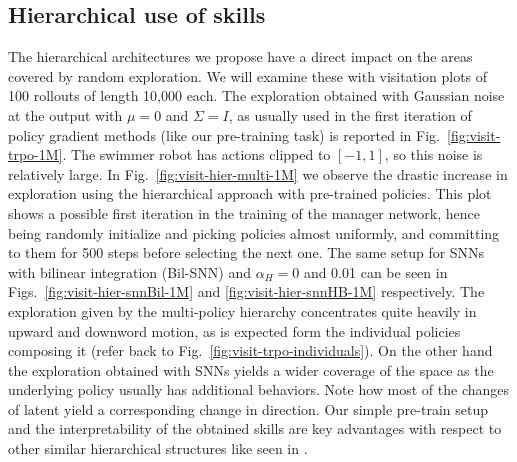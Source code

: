 \documentclass{article} %
\begin{document}

\subsection{Hierarchical use of skills}

The hierarchical architectures we propose have a direct impact on the areas covered by random exploration. We will examine these with visitation plots of 100 rollouts of length 10,000 each. The exploration obtained with Gaussian noise at the output with $\mu=0$ and $\Sigma=I$, as usually used in the first iteration of policy gradient methods (like our pre-training task) is reported in Fig.\ \ref{fig:visit-trpo-1M}. The swimmer robot has actions clipped to $[-1,1]$, so this noise is relatively large. In Fig.\ \ref{fig:visit-hier-multi-1M} we observe the drastic increase in exploration using the hierarchical approach with pre-trained policies. This plot shows a possible first iteration in the training of the manager network, hence being randomly initialize and picking policies almost uniformly, and committing to them for 500 steps before selecting the next one. The same setup for SNNs with bilinear integration (Bil-SNN) and $\alpha_H= 0$ and 0.01 can be seen in Figs.\ \ref{fig:visit-hier-snnBil-1M} and \ref{fig:visit-hier-snnHB-1M} respectively. The exploration given by the multi-policy hierarchy concentrates quite heavily in upward and downword motion, as is expected form the individual policies composing it (refer back to Fig.\ \ref{fig:visit-trpo-individuals}). On the other hand the exploration obtained with SNNs yields a wider coverage of the space as the underlying policy usually has additional behaviors. Note how most of the changes of latent yield a corresponding change in direction. Our simple pre-train setup and the interpretability of the obtained skills are key advantages with respect to other similar hierarchical structures like seen in \citet{heess2016learning}.
\end{document}
